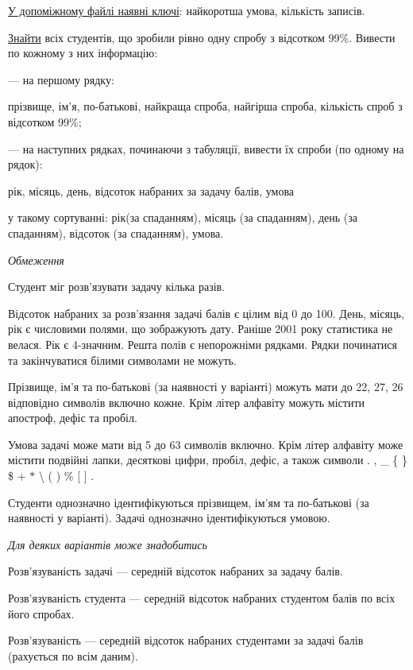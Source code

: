 \documentclass[11pt, ukrainian]{article}
\begin{document}
\underline{У допоміжному файлі наявні ключі}: найкоротша умова, кількість записів.

\underline{Знайти} всіх студентів, що зробили рівно одну спробу з відсотком 99\%. Вивести по кожному з них інформацію:\par
{\noindent}--- на першому рядку:\par
прізвище, ім’я, по-батькові, найкраща спроба, найгірша спроба, кількість спроб з відсотком 99\%;

{\noindent}--- на наступних рядках, починаючи з табуляції, вивести їх спроби (по одному на рядок):\par
рік, місяць, день, відсоток набраних за задачу балів, умова

{\noindent}у такому сортуванні: рік(за спаданням), місяць (за спаданням), день (за спаданням), відсоток (за спаданням), умова.


\bigskip\textit{Обмеження}

Студент міг розв’язувати задачу кілька разів.

Відсоток набраних за розв’язання задачі балів є цілим від 0 до 100.
День, місяць, рік є числовими полями, що зображують дату.
Раніше 2001 року статистика не велася. Рік є 4-значним.
Решта полів є непорожніми рядками.
Рядки починатися та закінчуватися білими символами не можуть.

Прізвище, ім’я та по-батькові (за наявності у варіанті) можуть мати до 22, 27, 26 відповідно символів включно кожне. 
Крім літер алфавіту можуть містити апостроф, дефіс та пробіл.

Умова задачі може мати від 5 до 63 символів включно.
Крім літер алфавіту може містити подвійні лапки, десяткові цифри, пробіл, дефіс,
а також символи . , \_ \{ \} \$ $+$ $*$ {\textbackslash} ( ) \% $[$ $]$ .

Студенти однозначно ідентифікуються прізвищем, ім’ям та по-батькові (за наявності у варіанті).
Задачі однозначно ідентифікуються умовою.

\bigskip\textit{Для деяких варіантів може знадобитись}

Розв'язуваність задачі --- середній відсоток набраних за задачу балів.

Розв'язуваність студента --- середній відсоток набраних студентом балів по всіх його спробах.

Розв'язуваність --- середній відсоток набраних студентами за задачі балів (рахується по всім даним).
\end{document}
